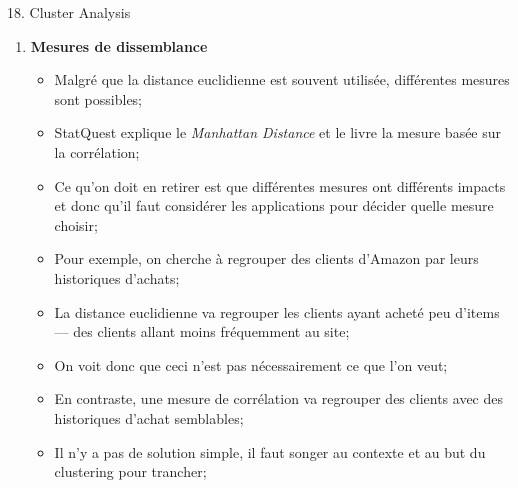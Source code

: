 \documentclass[12pt, titlepage, french]{report}
\begin{document}
\begin{CHPT_SUMM}[label = {CLUSTERS}]{18. Cluster Analysis}
\begin{enumerate}
\begin{enumerate}
		\item	\textbf{Single} linkage: Au lieu de mesurer la distance maximale, on mesure la distance minimal puis on regroupe;
		\item	\textbf{Average} linkage: On prends la moyenne des distances entres tous les points des deux clusters et on fusionne ceux ayant la plus faible distance moyenne;
		\item	\textbf{Centroid} linkage: On assigne un point \textit{centroïde} à chaque cluster ayant comme coordonnées la moyenne des coordonnées des points du clusters et on minimise la distance entre centroïdes;
		\end{enumerate}
	\item[]	\textbf{Mesures de dissemblance}
		\begin{itemize}
		\item	Malgré que la distance euclidienne est souvent utilisée, différentes mesures sont possibles;
		\item	StatQuest explique le \textit{Manhattan Distance} et le livre la mesure basée sur la corrélation;
		\item	Ce qu'on doit en retirer est que différentes mesures ont différents impacts et donc qu'il faut considérer les applications pour décider quelle mesure choisir;
		\item	Pour exemple, on cherche à regrouper des clients d'Amazon par leurs historiques d'achats;
		\item	La distance euclidienne va regrouper les clients ayant acheté peu d'items --- des clients allant moins fréquemment au site; 
		\item	On voit donc que ceci n'est pas nécessairement ce que l'on veut;
		\item	En contraste, une mesure de corrélation va regrouper des clients avec des historiques d'achat semblables;
		\item	Il n'y a pas de solution simple, il faut songer au contexte et au but du clustering pour trancher;

\end{itemize}
\end{enumerate}
\end{CHPT_SUMM}
\end{document}
